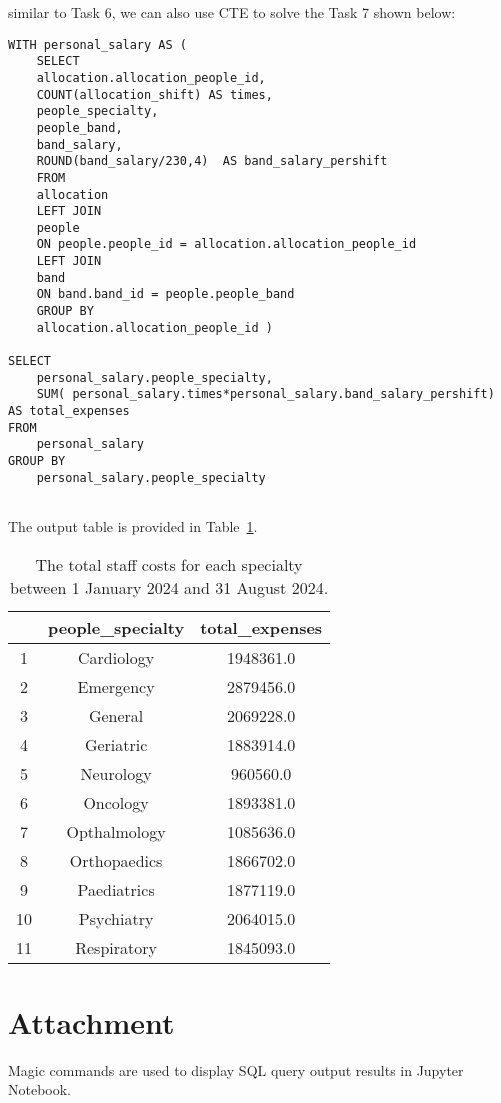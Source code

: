 \documentclass{article}
\begin{document}
similar to Task 6, we can also use CTE to solve the Task 7 shown below:

\begin{lstlisting}[style=sqlstyle]
WITH personal_salary AS (
    SELECT 
	allocation.allocation_people_id,
	COUNT(allocation_shift) AS times,
	people_specialty,
	people_band,
	band_salary,
	ROUND(band_salary/230,4)  AS band_salary_pershift 
    FROM 
	allocation
    LEFT JOIN
	people
	ON people.people_id = allocation.allocation_people_id
    LEFT JOIN
	band
	ON band.band_id = people.people_band
    GROUP BY
	allocation.allocation_people_id )
		
SELECT 
    personal_salary.people_specialty,
    SUM( personal_salary.times*personal_salary.band_salary_pershift) AS total_expenses
FROM 
    personal_salary
GROUP BY 
    personal_salary.people_specialty


\end{lstlisting}

The output table is provided in Table~\ref{tab:task7}.
\begin{table}[h]
    \centering
\begin{tabular}{|c|c|c|}
\hline & people\_specialty & total\_expenses \\
\hline 1 & Cardiology & 1948361.0 \\
\hline 2 & Emergency & 2879456.0 \\
\hline 3 & General & 2069228.0 \\
\hline 4 & Geriatric & 1883914.0 \\
\hline 5 & Neurology & 960560.0 \\
\hline 6 & Oncology & 1893381.0 \\
\hline 7 & Opthalmology & 1085636.0 \\
\hline 8 & Orthopaedics & 1866702.0 \\
\hline 9 & Paediatrics & 1877119.0 \\
\hline 10 & Psychiatry & 2064015.0 \\
\hline 11 & Respiratory & 1845093.0 \\
\hline
\end{tabular}
   \caption{The total staff costs for each specialty between 1 January 2024 and 31 August 2024.}
    \label{tab:task7}
\end{table}


\section{Attachment}
\label{attachment}

Magic commands are used to display SQL query output results in Jupyter Notebook.


\end{document}
